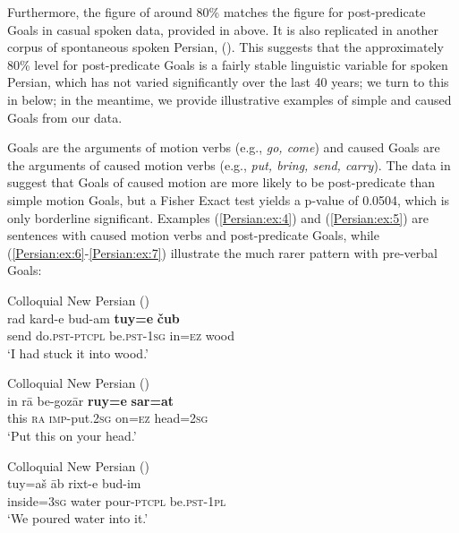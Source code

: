 \documentclass[output=paper,colorlinks,citecolor=brown,draftmode]{langscibook}
\begin{document}
Furthermore, the figure of around 80\% matches the figure for post-predicate Goals in  casual spoken data, provided in  above. It is also replicated in another corpus of spontaneous spoken Persian, (\citealt{Haig2017Keynote}). This suggests that the approximately 80\% level for post-predicate Goals is a fairly stable linguistic variable for spoken Persian, which has not varied significantly over the last 40 years; we turn to this in  below; in the meantime, we provide illustrative examples of simple and caused Goals from our data.

Goals are the arguments of motion verbs (e.g., \textit{go, come}) and caused Goals are the arguments of caused motion verbs (e.g., \textit{put, bring, send, carry}). The data in  suggest that Goals of caused motion are more likely to be post-predicate than simple motion Goals, but a Fisher Exact test yields a p-value of 0.0504, which is only borderline significant. Examples (\ref{Persian:ex:4}) and (\ref{Persian:ex:5}) are sentences with caused motion verbs and post-predicate Goals, while (\ref{Persian:ex:6}-\ref{Persian:ex:7}) illustrate the much rarer pattern with pre-verbal Goals:


\ea\label{Persian:ex:4}
Colloquial New Persian (\citealt[J, 1226]{Izadi2022Persian})\\
\gll rad kard-e bud-am \textbf{tuy=e} \textbf{čub} \\
send do\textsc{.pst-ptcpl} be\textsc{.pst-1sg} in\textsc{=ez} wood \\
\glt `I had stuck it into wood.'
\z


\newpage
\ea\label{Persian:ex:5}
Colloquial New Persian (\citealt[J, 1299]{Izadi2022Persian})\\
\gll in rā be-gozār \textbf{ruy=e} \textbf{sar=at} \\
this \textsc{ra} \textsc{imp-}put\textsc{.2sg} on\textsc{=ez} head\textsc{=2sg} \\
\glt `Put this on your head.' 
\z

\ea\label{Persian:ex:6}
Colloquial New Persian (\citealt[J, 1288]{Izadi2022Persian}) \\
\gll tuy=aš āb rixt-e bud-im \\
inside\textsc{=3sg} water pour\textsc{-ptcpl} be\textsc{.pst-1pl} \\
\glt `We poured water into it.' 
\z
\end{document}
